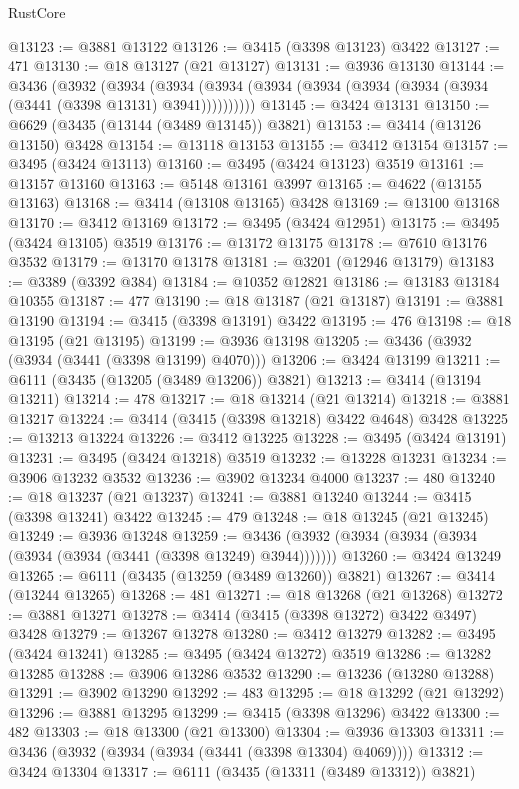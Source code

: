 \begin{lexlean}{RustCore}
\begin{coremodule}
@13123 := @3881 @13122
@13126 := @3415 (@3398 @13123) @3422
@13127 := 471
@13130 := @18 @13127 (@21 @13127)
@13131 := @3936 @13130
@13144 := @3436
    (@3932
      (@3934 (@3934 (@3934 (@3934 (@3934 (@3934 (@3934 (@3934 (@3441 (@3398 @13131) @3941))))))))))
@13145 := @3424 @13131
@13150 := @6629 (@3435 (@13144 (@3489 @13145)) @3821)
@13153 := @3414 (@13126 @13150) @3428
@13154 := @13118 @13153
@13155 := @3412 @13154
@13157 := @3495 (@3424 @13113)
@13160 := @3495 (@3424 @13123) @3519
@13161 := @13157 @13160
@13163 := @5148 @13161 @3997
@13165 := @4622 (@13155 @13163)
@13168 := @3414 (@13108 @13165) @3428
@13169 := @13100 @13168
@13170 := @3412 @13169
@13172 := @3495 (@3424 @12951)
@13175 := @3495 (@3424 @13105) @3519
@13176 := @13172 @13175
@13178 := @7610 @13176 @3532
@13179 := @13170 @13178
@13181 := @3201 (@12946 @13179)
@13183 := @3389 (@3392 @384)
@13184 := @10352 @12821
@13186 := @13183 @13184 @10355
@13187 := 477
@13190 := @18 @13187 (@21 @13187)
@13191 := @3881 @13190
@13194 := @3415 (@3398 @13191) @3422
@13195 := 476
@13198 := @18 @13195 (@21 @13195)
@13199 := @3936 @13198
@13205 := @3436 (@3932 (@3934 (@3441 (@3398 @13199) @4070)))
@13206 := @3424 @13199
@13211 := @6111 (@3435 (@13205 (@3489 @13206)) @3821)
@13213 := @3414 (@13194 @13211)
@13214 := 478
@13217 := @18 @13214 (@21 @13214)
@13218 := @3881 @13217
@13224 := @3414 (@3415 (@3398 @13218) @3422 @4648) @3428
@13225 := @13213 @13224
@13226 := @3412 @13225
@13228 := @3495 (@3424 @13191)
@13231 := @3495 (@3424 @13218) @3519
@13232 := @13228 @13231
@13234 := @3906 @13232 @3532
@13236 := @3902 @13234 @4000
@13237 := 480
@13240 := @18 @13237 (@21 @13237)
@13241 := @3881 @13240
@13244 := @3415 (@3398 @13241) @3422
@13245 := 479
@13248 := @18 @13245 (@21 @13245)
@13249 := @3936 @13248
@13259 := @3436 (@3932 (@3934 (@3934 (@3934 (@3934 (@3934 (@3441 (@3398 @13249) @3944)))))))
@13260 := @3424 @13249
@13265 := @6111 (@3435 (@13259 (@3489 @13260)) @3821)
@13267 := @3414 (@13244 @13265)
@13268 := 481
@13271 := @18 @13268 (@21 @13268)
@13272 := @3881 @13271
@13278 := @3414 (@3415 (@3398 @13272) @3422 @3497) @3428
@13279 := @13267 @13278
@13280 := @3412 @13279
@13282 := @3495 (@3424 @13241)
@13285 := @3495 (@3424 @13272) @3519
@13286 := @13282 @13285
@13288 := @3906 @13286 @3532
@13290 := @13236 (@13280 @13288)
@13291 := @3902 @13290
@13292 := 483
@13295 := @18 @13292 (@21 @13292)
@13296 := @3881 @13295
@13299 := @3415 (@3398 @13296) @3422
@13300 := 482
@13303 := @18 @13300 (@21 @13300)
@13304 := @3936 @13303
@13311 := @3436 (@3932 (@3934 (@3934 (@3441 (@3398 @13304) @4069))))
@13312 := @3424 @13304
@13317 := @6111 (@3435 (@13311 (@3489 @13312)) @3821)

\end{coremodule}
\end{lexlean}
